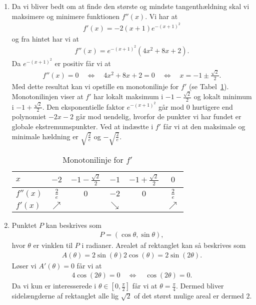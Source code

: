 \begin{enumerate}
	
	\item Da vi bliver bedt om at finde den største og mindste tangenthældning skal vi maksimere og minimere funktionen $f''(x)$. Vi har at
	\begin{align*}
	f'(x)=-2(x+1)e^{-(x+1)^2}
	\end{align*}
	og fra hintet har vi at
	\begin{align*}
	f''(x)=e^{-(x+1)^2}(4x^2+8x+2).
	\end{align*}
	Da $e^{-(x+1)^2}$ er positiv får vi at
	\begin{align*}
	f''(x)=0\quad \Leftrightarrow \quad 4x^2+8x+2=0 \quad \Leftrightarrow \quad x=-1\pm \frac{\sqrt{2}}{2}.
	\end{align*}
	Med dette resultat kan vi opstille en monotonilinje for $f'$ (se Tabel~\ref{fig:opt2}). Monotonilinjen viser at $f'$ har lokalt maksimum i $-1- \frac{\sqrt{2}}{2}$ og lokalt minimum i $-1+\frac{\sqrt{2}}{2}$. Den eksponentielle faktor $e^{-(x+1)^2}$ går mod $0$ hurtigere end polynomiet $-2x-2$ går mod uendelig, hvorfor de punkter vi har fundet er globale ekstremumspunkter. Ved at indæstte i $f'$ får vi at den maksimale og minimale hældning er $\sqrt{\frac{2}{e}}$ og $-\sqrt{\frac{2}{e}}$.
	\begin{table}[h!]
		\centering
		\begin{tabular}{@{}l  c c c c c@{}}
			$x$      & $-2$ 			 & $-1-\frac{\sqrt{2}}{2}$	& $-1$		& $-1+\frac{\sqrt{2}}{2}$	&$0$			\\ \toprule
			$f''(x)$  & $\frac{2}{e}$	 &     $0$ 		 			& $-2$		& $0$						&$\frac{2}{e}$	\\ \midrule
			$f'(x)$   & $\nearrow$&									& $\searrow$&							&$\nearrow$			\\ \bottomrule  
		\end{tabular}	
		\caption{Monotonilinje for $f'$}
		\label{fig:opt2}
\end{table}	
	
	\item Punktet $P$ kan beskrives som
	\begin{align*}
	P=(\cos \theta,\sin\theta),
	\end{align*}
	hvor $\theta$ er vinklen til $P$ i radianer. Arealet af rektanglet kan så beskrives som
	\begin{align*}
	A(\theta)=2\sin(\theta)2\cos(\theta)=2\sin(2\theta).
	\end{align*}
	Løser vi $A'(\theta)=0$ får vi at 
	\begin{align*}
	4\cos(2\theta)=0\quad\Leftrightarrow\quad \cos(2\theta)=0.
	\end{align*}
	Da vi kun er interesserede i $\theta\in [0,\frac{\pi}{2}]$ får vi at $\theta=\frac{\pi}{4}$. Dermed bliver sidelængderne af rektanglet alle lig $\sqrt{2}$ of det størst mulige areal er dermed $2$.
	

\end{enumerate}
